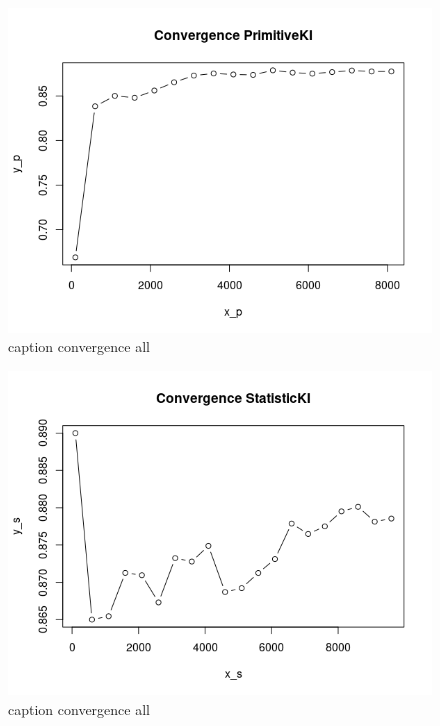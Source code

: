 \documentclass[11pt]{article}
\newcommand\BibTeX{B{\sc ib}\TeX}
\begin{document}
\begin{figure}[H]
	\centering
	\includegraphics[width=.45\textwidth]{../testdata/conv_prim.png}
	\caption{caption convergence all}
	\label{convergence primitive}
\end{figure}
\begin{figure}[H]
	\centering
	\includegraphics[width=.45\textwidth]{../testdata/conv_stat.png}
	\caption{caption convergence all}
	\label{convergence statistic}
\end{figure}


\end{document}
